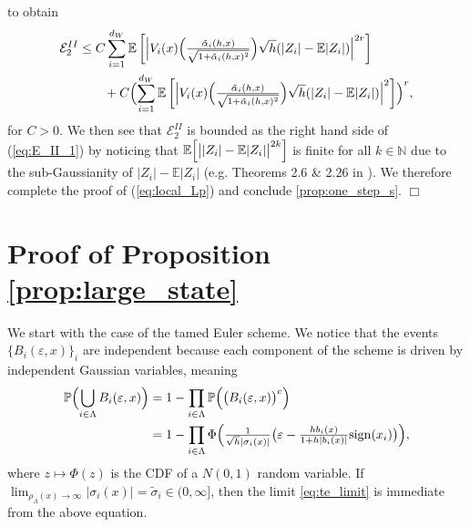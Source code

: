 \documentclass[11pt]{article}
\begin{document}
to obtain 
% 
\begin{align}
\mathcal{E}_2^{II} 
& \le C \sum_{i = 1}^{d_W} \mathbb{E} \left[ \Bigl| V_i (x)  \Bigl( \tfrac{\tilde{\alpha}_i (h, x)}{\sqrt{1 + \tilde{\alpha}_i (h, x)^2}} \Bigr)  \sqrt{h} (|Z_i| - \mathbb{E} |Z_i| ) \Bigr|^{2r} \right] \\
& \qquad + C 
\Bigl( \sum_{i = 1}^{d_W} \mathbb{E} \left[ \Bigl| V_{i} (x)  \Bigl( \tfrac{\tilde{\alpha}_i (h, x)}{\sqrt{1 + \tilde{\alpha}_i (h, x)^2}} \Bigr) \sqrt{h} (|Z_i| - \mathbb{E} |Z_i| ) \Bigr|^{2} \right] 
\Bigr)^r,   
\end{align} 
% 
for $C > 0$. 
We then see that $\mathcal{E}_2^{II} $ is bounded as the right hand side of (\ref{eq:E_II_1}) by noticing that $\mathbb{E} \Bigl[ \bigl|  |Z_i| - \mathbb{E} |Z_i| \bigr|^{2k} \Bigr]$ is finite for all $k \in \mathbb{N}$ due to the sub-Gaussianity of $|Z_i| - \mathbb{E} |Z_i|$ (e.g. Theorems 2.6 \& 2.26 in \cite{Wain:19}). We therefore complete the proof of (\ref{eq:local_Lp}) and conclude \cref{prop:one_step_s}.  $\Box$

\section{Proof of Proposition \ref{prop:large_state}} \label{sec:pf_large_state}

We start with the case of the tamed Euler scheme. We notice that the events $\{ B_i (\varepsilon, x) \}_i$ are independent because each component of the scheme is driven by independent Gaussian variables, meaning
% 
\begin{align*}
\mathbb{P} \Bigl( \bigcup_{i \in \Lambda} B_i (\varepsilon, x)  \Bigr) & = 1 - \prod_{i \in \Lambda} \mathbb{P} \Bigl(\bigl(B_i (\varepsilon, x)\bigr)^c  \Bigr) \\ 
& = 1 - \prod_{i \in \Lambda} \Phi \Bigl( \tfrac{1}{\sqrt{h} |\sigma_i (x)|} \bigl( \varepsilon - \tfrac{h b_i(x)}{1 + h | b_i (x)|} \mathrm{sign} (x_i) \bigr) \Bigr),  
\end{align*} 
%
where $z \mapsto \Phi (z)$ is the CDF of a $N(0,1)$ random variable. 
% 
% 
If $\lim_{\rho_\Lambda(x) \to \infty}|\sigma_i(x)| = \widetilde{\sigma}_i \in (0, \infty]$, then the limit \eqref{eq:te_limit} is immediate from the above equation. 
% 
% 
\end{document}
